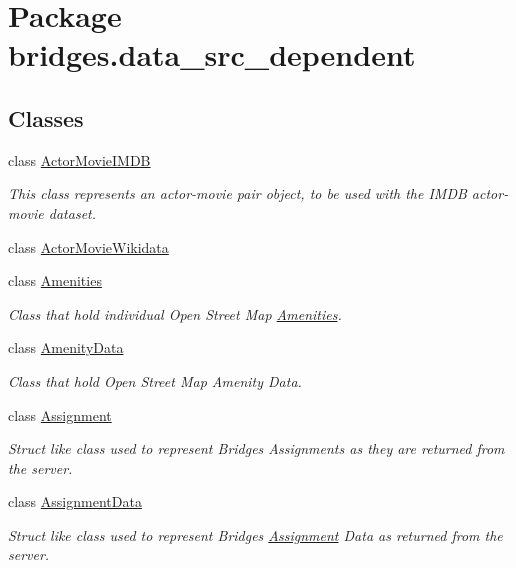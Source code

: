 \hypertarget{namespacebridges_1_1data__src__dependent}{}\section{Package bridges.\+data\+\_\+src\+\_\+dependent}
\label{namespacebridges_1_1data__src__dependent}
\subsection*{Classes}
\begin{DoxyCompactItemize}
\item 
class \hyperlink{classbridges_1_1data__src__dependent_1_1_actor_movie_i_m_d_b}{Actor\+Movie\+I\+M\+DB}
\begin{DoxyCompactList}\small\item\em This class represents an actor-\/movie pair object, to be used with the I\+M\+DB actor-\/movie dataset. \end{DoxyCompactList}\item 
class \hyperlink{classbridges_1_1data__src__dependent_1_1_actor_movie_wikidata}{Actor\+Movie\+Wikidata}
\item 
class \hyperlink{classbridges_1_1data__src__dependent_1_1_amenities}{Amenities}
\begin{DoxyCompactList}\small\item\em Class that hold individual Open Street Map \hyperlink{classbridges_1_1data__src__dependent_1_1_amenities}{Amenities}. \end{DoxyCompactList}\item 
class \hyperlink{classbridges_1_1data__src__dependent_1_1_amenity_data}{Amenity\+Data}
\begin{DoxyCompactList}\small\item\em Class that hold Open Street Map Amenity Data. \end{DoxyCompactList}\item 
class \hyperlink{classbridges_1_1data__src__dependent_1_1_assignment}{Assignment}
\begin{DoxyCompactList}\small\item\em Struct like class used to represent Bridges Assignments as they are returned from the server. \end{DoxyCompactList}\item 
class \hyperlink{classbridges_1_1data__src__dependent_1_1_assignment_data}{Assignment\+Data}
\begin{DoxyCompactList}\small\item\em Struct like class used to represent Bridges \hyperlink{classbridges_1_1data__src__dependent_1_1_assignment}{Assignment} Data as returned from the server. \end{DoxyCompactList}\item 

\end{DoxyCompactItemize}
